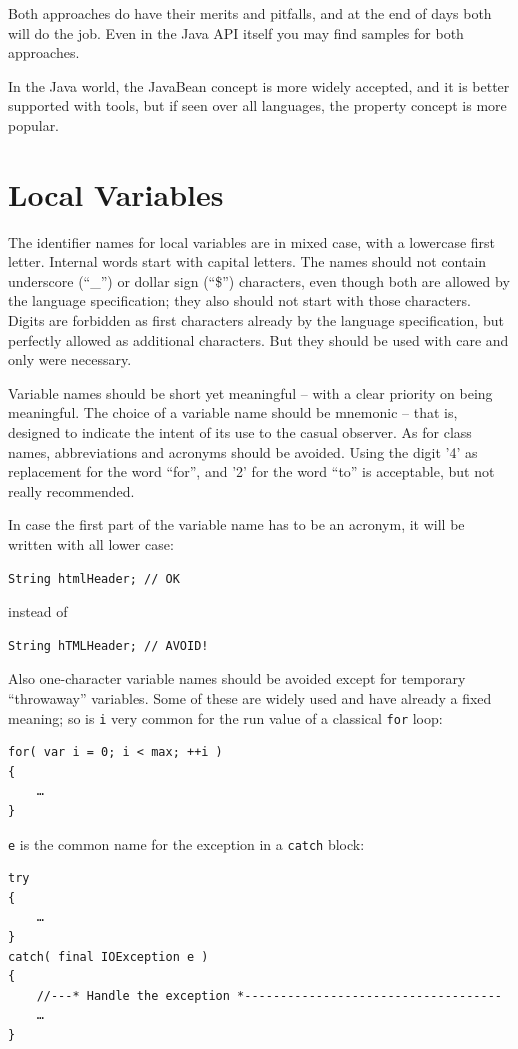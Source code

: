 \documentclass[12pt,a4paper,titlepage, parskip=half, headsepline, footsepline, cleardoubleplain]{scrbook}
\begin{document}
Both approaches do have their merits and pitfalls, and at the end of days both will do the job. Even in the Java API itself you may find samples for both approaches.

In the Java world, the JavaBean concept is more widely accepted, and it is better supported with tools, but if seen over all languages, the property concept is more popular.

\section{Local Variables}\label{sec:NamesForLocalVariables}
The identifier names for local variables are in mixed case, with a lowercase first letter. Internal words start with capital letters. The names should not contain underscore (“\_”) or dollar sign (“\$”) characters, even though both are allowed by the language specification; they also should not start with those characters. Digits are forbidden as first characters already by the language specification, but perfectly allowed as additional characters. But they should be used with care and only were necessary.

Variable names should be short yet meaningful – with a clear priority on being meaningful. The choice of a variable name should be mnemonic – that is, designed to indicate the intent of its use to the casual observer. As for class names, abbreviations and acronyms should be avoided. Using the digit '4' as replacement for the word “for”, and '2' for the word “to” is acceptable, but not really recommended.

In case the first part of the variable name has to be an acronym, it will be written with all lower case:
\begin{lstlisting}
String htmlHeader; // OK
\end{lstlisting}
instead of
\begin{lstlisting}
String hTMLHeader; // AVOID!
\end{lstlisting}

Also one-character variable names should be avoided except for temporary “throwaway” variables. Some of these are widely used and have already a fixed meaning; so is \lstinline|i| very common for the run value of a classical \lstinline|for| loop:
\begin{lstlisting}
for( var i = 0; i < max; ++i )
{
    …
}
\end{lstlisting}

\lstinline|e| is the common name for the exception in a \lstinline|catch| block:
\begin{lstlisting}
try
{
    …
}
catch( final IOException e )
{
    //---* Handle the exception *------------------------------------
    …
}    
\end{lstlisting}
\end{document}
